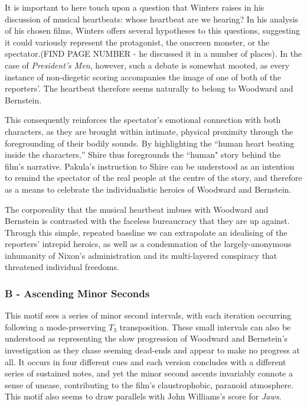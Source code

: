 It is important to here touch upon a question that Winters raises in his discussion of musical heartbeats: whose heartbeat are we hearing?
In his analysis of his chosen films, Winters offers several hypotheses to this questions, suggesting it could variously represent the protagonist, the onscreen monster, or the spectator.(FIND PAGE NUMBER - he discussed it in a number of places).
In the case of \textit{President's Men}, however, such a debate is somewhat mooted, as every instance of non-diegetic scoring accompanies the image of one of both of the reporters'.
The heartbeat therefore seems naturally to belong to Woodward and Bernstein.

This consequently reinforces the spectator's emotional connection with both characters, as they are brought within intimate, physical proximity through the foregrounding of their bodily sounds.
By highlighting the ``human heart beating inside the characters,” Shire thus foregrounds the ``human" story behind the film's narrative.
Pakula's instruction to Shire can be understood as an intention to remind the spectator of the real people at the centre of the story, and therefore as a means to celebrate the individualistic heroics of Woodward and Bernstein.

The corporeality that the musical heartbeat imbues with Woodward and Bernstein is contrasted with the faceless bureaucracy that they are up against.
Through this simple, repeated bassline we can extrapolate an idealising of the reporters' intrepid heroics, as well as a condemnation of the largely-anonymous inhumanity of Nixon's administration and its multi-layered conspiracy that threatened individual freedoms.


\subsubsection{B - Ascending Minor Seconds}

This motif sees a series of minor second intervals, with each iteration occurring following a mode-preserving $T_3$ transposition.
These small intervals can also be understood as representing the slow progression of Woodward and Bernstein's investigation as they chase seeming dead-ends and appear to make no progress at all.
It occurs in four different cues and each version concludes with a different series of sustained notes, and yet the minor second ascents invariably connote a sense of unease, contributing to the film's claustrophobic, paranoid atmosphere.
This motif also seems to draw parallels with John Williams's score for \textit{Jaws}.

